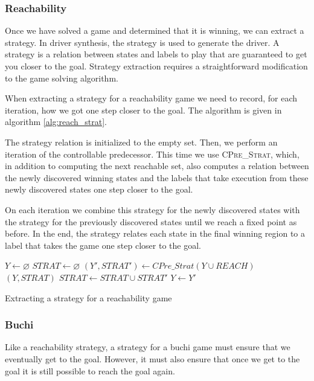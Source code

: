 \documentclass{book}
\theoremstyle{definition}
\begin{document}
\subsubsection{Reachability}

Once we have solved a game and determined that it is winning, we can extract a strategy. In driver synthesis, the strategy is used to generate the driver. A strategy is a relation between states and labels to play that are guaranteed to get you closer to the goal. Strategy extraction requires a straightforward modification to the game solving algorithm.

When extracting a strategy for a reachability game we need to record, for each iteration, how we got one step closer to the goal. The algorithm is given in algorithm \ref{alg:reach_strat}. 

The strategy relation is initialized to the empty set. Then, we perform an iteration of the controllable predecessor. This time we use \textsc{CPre\_Strat}, which, in addition to computing the next reachable set, also computes a relation between the newly discovered winning states and the labels that take execution from these newly discovered states one step closer to the goal.

On each iteration we combine this strategy for the newly discovered states with the strategy for the previously discovered states until we reach a fixed point as before. In the end, the strategy relates each state in the final winning region to a label that takes the game one step closer to the goal.

\begin{algorithm}[t]
\begin{algorithmic}
\State $Y \gets \varnothing$
\State $STRAT \gets \varnothing$
\Loop
\State $(Y', STRAT') \gets CPre\_Strat(Y \cup REACH)$
\State\Return $(Y, STRAT)$\EndIf
\State $STRAT \gets STRAT \cup STRAT'$
\State $Y \gets Y'$
\EndLoop
\EndFunction
\end{algorithmic}
\caption{Extracting a strategy for a reachability game}
\label{alg:reach_strat}
\end{algorithm}

\subsubsection{Buchi}

Like a reachability strategy, a strategy for a buchi game must ensure that we eventually get to the goal. However, it must also ensure that once we get to the goal it is still possible to reach the goal again. 
\end{document}
